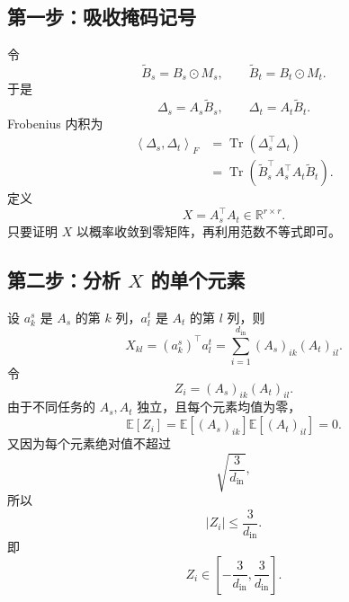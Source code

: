 \documentclass[UTF8,12pt,a4paper,fontset=none]{ctexart}
\numberwithin{equation}{section}
\newcommand{\R}{\mathbb{R}}
\newcommand{\E}{\mathbb{E}}
\newcommand{\ip}[2]{\left\langle #1,#2\right\rangle_F}
\newcommand{\tr}{\operatorname{Tr}}
\begin{document}
\subsection{第一步：吸收掩码记号}

令
\begin{equation}
  \widetilde B_s=B_s\odot M_s,
  \qquad
  \widetilde B_t=B_t\odot M_t.
\end{equation}
于是
\begin{equation}
  \Delta_s=A_s\widetilde B_s,
  \qquad
  \Delta_t=A_t\widetilde B_t.
\end{equation}
Frobenius 内积为
\begin{align}
  \ip{\Delta_s}{\Delta_t}
  &=\tr(\Delta_s^{\top}\Delta_t)\\
  &=\tr(\widetilde B_s^{\top}A_s^{\top}A_t\widetilde B_t).
  \tag{9}
  \label{eq:paper9}
\end{align}
定义
\begin{equation}
  X=A_s^{\top}A_t\in\R^{r\times r}.
  \label{eq:X-def}
\end{equation}
只要证明 $X$ 以概率收敛到零矩阵，再利用范数不等式即可。

\subsection{第二步：分析 \texorpdfstring{$X$}{X} 的单个元素}

设 $a_k^s$ 是 $A_s$ 的第 $k$ 列，$a_l^t$ 是 $A_t$ 的第 $l$ 列，则
\begin{equation}
  X_{kl}=(a_k^s)^{\top}a_l^t
  =\sum_{i=1}^{d_{\mathrm{in}}}(A_s)_{ik}(A_t)_{il}.
\end{equation}
令
\begin{equation}
  Z_i=(A_s)_{ik}(A_t)_{il}.
\end{equation}
由于不同任务的 $A_s,A_t$ 独立，且每个元素均值为零，
\begin{equation}
  \E[Z_i]
  =\E[(A_s)_{ik}]\E[(A_t)_{il}]=0.
\end{equation}
又因为每个元素绝对值不超过
\begin{equation}
  \sqrt{\frac{3}{d_{\mathrm{in}}}},
\end{equation}
所以
\begin{equation}
  |Z_i|\le \frac{3}{d_{\mathrm{in}}}.
\end{equation}
即
\begin{equation}
  Z_i\in\left[-\frac{3}{d_{\mathrm{in}}},
  \frac{3}{d_{\mathrm{in}}}\right].
\end{equation}
\end{document}
